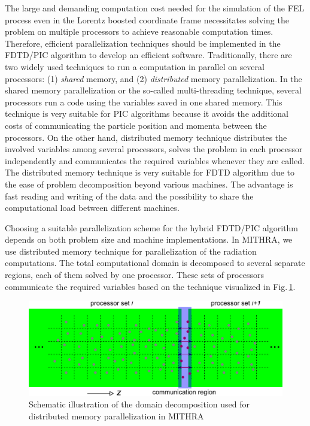 The large and demanding computation cost needed for the simulation of the FEL process even in the Lorentz boosted coordinate frame necessitates solving the problem on multiple processors to achieve reasonable computation times.
%
Therefore, efficient parallelization techniques should be implemented in the FDTD/PIC algorithm to develop an efficient software.
%
Traditionally, there are two widely used techniques to run a computation in parallel on several processors: (1) \textit{shared} memory, and (2) \textit{distributed} memory parallelization.
%
In the shared memory parallelization or the so-called multi-threading technique, several processors run a code using the variables saved in one shared memory.
%
This technique is very suitable for PIC algorithms because it avoids the additional costs of communicating the particle position and momenta between the processors.
%
On the other hand, distributed memory technique distributes the involved variables among several processors, solves the problem in each processor independently and communicates the required variables whenever they are called.
%
The distributed memory technique is very suitable for FDTD algorithm due to the ease of problem decomposition beyond various machines.
%
The advantage is fast reading and writing of the data and the possibility to share the computational load between different machines.

Choosing a suitable parallelization scheme for the hybrid FDTD/PIC algorithm depends on both problem size and machine implementations.
%
In MITHRA, we use distributed memory technique for parallelization of the radiation computations.
%
The total computational domain is decomposed to several separate regions, each of them solved by one processor.
%
These sets of processors communicate the required variables based on the technique visualized in Fig.\,\ref{FDTDPICFig5}.
%
\begin{figure}
\centering
\includegraphics[width=5.0in]{./MITHRA_FDTDPIC/Fig5/Fig5.pdf}
\caption{Schematic illustration of the domain decomposition used for distributed memory parallelization in MITHRA}
\label{FDTDPICFig5}
\end{figure}

